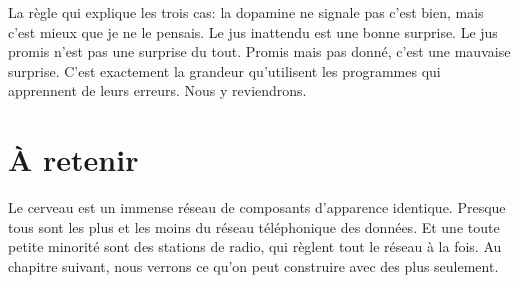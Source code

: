 La règle qui explique les trois cas: la dopamine ne signale pas \og c'est bien\fg{}, mais \og c'est mieux que je ne le pensais\fg{}. Le jus inattendu est une bonne surprise. Le jus promis n'est pas une surprise du tout. Promis mais pas donné, c'est une mauvaise surprise. C'est exactement la grandeur qu'utilisent les programmes qui apprennent de leurs erreurs. Nous y reviendrons.

\section*{À retenir}

Le cerveau est un immense réseau de composants d'apparence identique. Presque tous sont les \og plus\fg{} et les \og moins\fg{} du réseau téléphonique des données. Et une toute petite minorité sont des stations de radio, qui règlent tout le réseau à la fois. Au chapitre suivant, nous verrons ce qu'on peut construire avec des \og plus\fg{} seulement.

